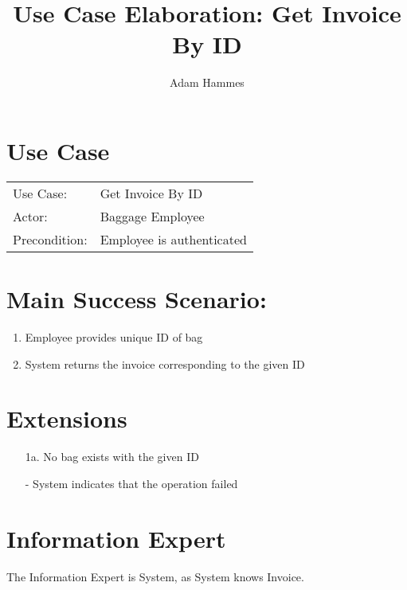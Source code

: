 \documentclass{article}
\title{Use Case Elaboration: Get Invoice By ID}
\author{ Adam Hammes }
\begin{document}
\maketitle


\section*{Use Case}
\begin{tabular}{l l}
Use Case:     & Get Invoice By ID\\
Actor:        & Baggage Employee\\
Precondition: & Employee is authenticated\\
\end{tabular}
 

\section*{Main Success Scenario:}

\begin{enumerate}
    \item Employee provides unique ID of bag
    \item System returns the invoice corresponding to the given ID

\end{enumerate}

\section*{Extensions}

\begin{itemize}
    \item [1a.] No bag exists with the given ID
    
    - System indicates that the operation failed
\end{itemize}

\section*{Information Expert}

The Information Expert is System, as System knows Invoice.
\end{document}
